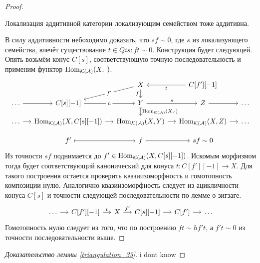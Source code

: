 \documentclass[../main.tex]{subfiles}
\begin{document}
\begin{proof}
\begin{to_lem}
Локализация аддитивной категории локализующим семейством тоже аддитивна.
\end{to_lem}
В силу аддитивности небоходимо доказать, что $sf\sim 0$, где $s$ из локализующего семейства, влечёт существование $t\in Qis: ft\sim 0$.
Конструкция будет следующей. Опять возьмём конус $C[s]$, соответствующую точную последовательность и применим функтор $\operatorname{Hom}_{\mathcal{K}(\mathcal{A})}(X, \cdot)$.
    \begin{equation*}
        \begin{tikzcd}[sep=small]
	&& X&C[f'][-1] \\
	\ldots & {C[s][-1]} & Y & Z & \ldots \\
	\ldots & {\Hom_{\mathcal{K}(\mathcal{A})}(X, C[s][-1])} & {\Hom_{\mathcal{K}(\mathcal{A})}(X, Y)} & {\Hom_{\mathcal{K}(\mathcal{A})}(X, Z)} & \ldots \\
	& {f'} & f & {sf\sim 0}
    \arrow[from=1-4, to=1-3, "t"]
	\arrow["h"{description}, from=2-2, to=2-3]
	\arrow["s", from=2-3, to=2-4]
	\arrow[from=2-4, to=2-5]
	\arrow[from=2-1, to=2-2]
	\arrow["{\Hom_{\mathcal{K}(\mathcal{A})}(X, \cdot)}", maps to, from=2-3, to=3-3]
	\arrow[from=3-2, to=3-3]
	\arrow[from=3-1, to=3-2]
	\arrow[from=3-3, to=3-4]
	\arrow[from=3-4, to=3-5]
	\arrow["f"', from=1-3, to=2-3]
	\arrow[maps to, from=4-3, to=4-4]
	\arrow[maps to, from=4-2, to=4-3]
    \arrow[from=1-3, to=2-2, "f'"{description}]
\end{tikzcd}
    \end{equation*}
Из точности $sf$ поднимается до $f'\in \operatorname{Hom}_{\mathcal{K}(\mathcal{A})}(X, C[s][-1])$. Искомым морфизмом тогда будет соответствующий канонический для конуса $t:C[f'][-1]\to X$.
Для такого построения остается проверить квазиизоморфность и гомотопность композиции нулю. Аналогично квазиизоморфность следует из ацикличности конуса $C[s]$ и точности следующей последовательности по лемме о зигзаге.
\begin{equation*}
    \begin{tikzcd}[sep=small]
	\ldots & {C[f'][-1]} & X & {C[s][-1]} & {C[f']} & \ldots
	\arrow["t", from=1-2, to=1-3]
	\arrow["f'", from=1-3, to=1-4]
	\arrow[from=1-4, to=1-5]
	\arrow[from=1-5, to=1-6]
	\arrow[from=1-1, to=1-2]
\end{tikzcd}
\end{equation*}
Гомотопность нулю следует из того, что по построению $ft\sim hf't$, а $f't\sim 0$ из точности последовательности выше.
\end{proof}
\begin{proof}[Доказательство леммы \ref{triangulation_33}]
    i dont know
\end{proof}
\end{document}
